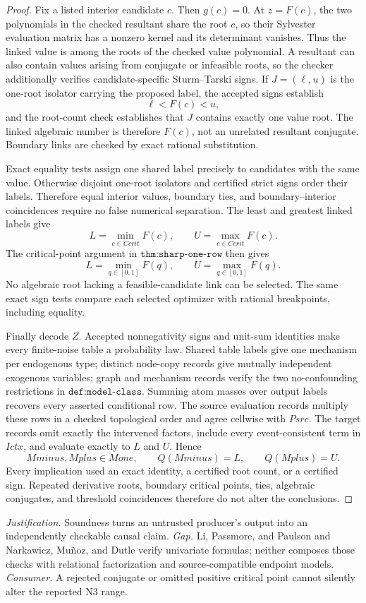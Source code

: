 \documentclass{article}
\begin{document}
\begin{proof}
Fix a listed interior candidate \(c\).  Then \(g(c)=0\).  At \(z=F(c)\), the two polynomials in the checked resultant share the root \(c\), so their Sylvester evaluation matrix has a nonzero kernel and its determinant vanishes.  Thus the linked value is among the roots of the checked value polynomial.  A resultant can also contain values arising from conjugate or infeasible roots, so the checker additionally verifies candidate-specific Sturm--Tarski signs.  If \(J=(\ell,u)\) is the one-root isolator carrying the proposed label, the accepted signs establish
\[
 \ell<F(c)<u,
\]
and the root-count check establishes that \(J\) contains exactly one value root.  The linked algebraic number is therefore \(F(c)\), not an unrelated resultant conjugate.  Boundary links are checked by exact rational substitution.

Exact equality tests assign one shared label precisely to candidates with the same value.  Otherwise disjoint one-root isolators and certified strict signs order their labels.  Therefore equal interior values, boundary ties, and boundary--interior coincidences require no false numerical separation.  The least and greatest linked labels give
\[
 L=\min_{c\in Ccrit}F(c),
 \qquad
 U=\max_{c\in Ccrit}F(c).
\]
The critical-point argument in \(\texttt{thm:sharp-one-row}\) then gives
\[
 L=\min_{q\in[0,1]}F(q),
 \qquad
 U=\max_{q\in[0,1]}F(q).
\]
No algebraic root lacking a feasible-candidate link can be selected.  The same exact sign tests compare each selected optimizer with rational breakpoints, including equality.

Finally decode \(Z\).  Accepted nonnegativity signs and unit-sum identities make every finite-noise table a probability law.  Shared table labels give one mechanism per endogenous type; distinct node-copy records give mutually independent exogenous variables; graph and mechanism records verify the two no-confounding restrictions in \(\texttt{def:model-class}\).  Summing atom masses over output labels recovers every asserted conditional row.  The source evaluation records multiply these rows in a checked topological order and agree cellwise with \(Psrc\).  The target records omit exactly the intervened factors, include every event-consistent term in \(Ictx\), and evaluate exactly to \(L\) and \(U\).  Hence
\[
 Mminus,Mplus\in Mone,
 \qquad Q(Mminus)=L,
 \qquad Q(Mplus)=U.
\]
Every implication used an exact identity, a certified root count, or a certified sign.  Repeated derivative roots, boundary critical points, ties, algebraic conjugates, and threshold coincidences therefore do not alter the conclusions.
\end{proof}
\par\smallskip\noindent \textit{Justification.} Soundness turns an untrusted producer's output into an independently checkable causal claim. \textit{Gap.} Li, Passmore, and Paulson and Narkawicz, Mu\~noz, and Dutle verify univariate formulas; neither composes those checks with relational factorization and source-compatible endpoint models. \textit{Consumer.} A rejected conjugate or omitted positive critical point cannot silently alter the reported N3 range.
\end{document}

